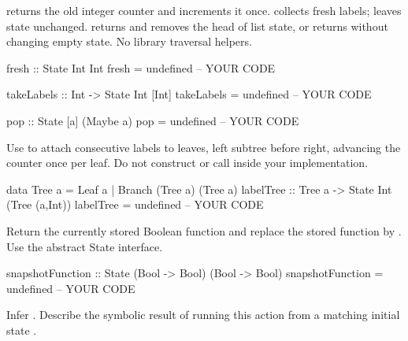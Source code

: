  returns the old integer counter and increments it once.
 collects  fresh labels;  leaves state
unchanged.  returns and removes the head of list state, or returns
 without changing empty state. No library traversal helpers.
\par\noindent\begin{minipage}{\linewidth}
\begin{codeanswer}
fresh :: State Int Int
fresh = undefined  -- YOUR CODE

takeLabels :: Int -> State Int [Int]
takeLabels = undefined  -- YOUR CODE

pop :: State [a] (Maybe a)
pop = undefined  -- YOUR CODE
\end{codeanswer}
\end{minipage}\par

Use  to attach consecutive labels to leaves, left subtree before
right, advancing the counter once per leaf. Do not construct  or call
 inside your implementation.
\par\noindent\begin{minipage}{\linewidth}
\begin{codeanswer}
data Tree a = Leaf a | Branch (Tree a) (Tree a)
labelTree :: Tree a -> State Int (Tree (a,Int))
labelTree = undefined  -- YOUR CODE
\end{codeanswer}
\end{minipage}\par

Return the currently stored Boolean function and replace the stored function by
. Use the abstract State interface.
\par\noindent\begin{minipage}{\linewidth}
\begin{codeanswer}
snapshotFunction :: State (Bool -> Bool) (Bool -> Bool)
snapshotFunction = undefined  -- YOUR CODE
\end{codeanswer}
\end{minipage}\par
{}

Infer . Describe the symbolic result of
running this action from a matching initial state .
